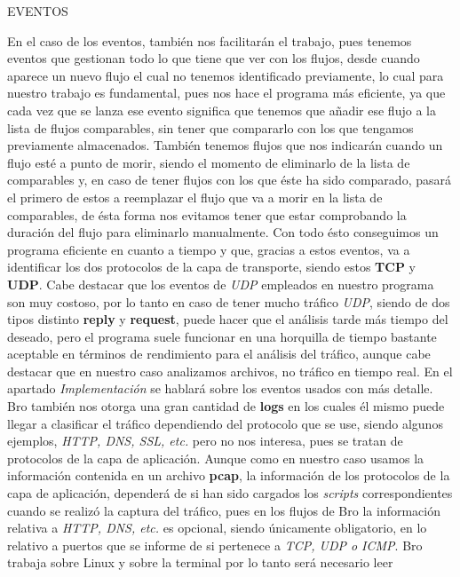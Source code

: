 EVENTOS

En el caso de los eventos, también nos facilitarán el trabajo, pues tenemos 
eventos que gestionan todo lo que tiene que ver con los flujos, desde 
cuando aparece un nuevo flujo el cual no tenemos identificado previamente, 
lo cual para nuestro trabajo es fundamental, pues nos hace el programa más 
eficiente, ya que cada vez que se lanza ese evento significa que tenemos 
que añadir ese flujo a la lista de flujos comparables, sin tener que 
compararlo con los que tengamos previamente almacenados. También tenemos 
flujos que nos indicarán cuando un flujo esté a punto de morir, siendo el 
momento de eliminarlo de la lista de comparables y, en caso de tener 
flujos con los que éste ha sido comparado, pasará el primero de estos a 
reemplazar el flujo que va a morir en la lista de comparables, de ésta 
forma nos evitamos tener que estar comprobando la duración del flujo 
para eliminarlo manualmente. Con todo ésto conseguimos un programa eficiente 
en cuanto a tiempo y que, gracias a estos eventos, va a identificar los dos 
protocolos de la capa de transporte, siendo estos \textbf{TCP} y \textbf{UDP}. Cabe destacar que los 
eventos de \textit{UDP} empleados en nuestro programa son muy costoso, por lo tanto 
en caso de tener mucho tráfico \textit{UDP}, siendo de dos tipos distinto \textbf{reply} y 
\textbf{request}, puede hacer que el análisis tarde más tiempo del deseado, pero 
el programa suele funcionar en una horquilla de tiempo bastante aceptable 
en términos de rendimiento para el análisis del tráfico, aunque cabe 
destacar que en nuestro caso analizamos archivos, no tráfico en tiempo real. 
En el apartado \textit{Implementación} se hablará sobre los eventos usados con más detalle.
\intro
Bro también nos otorga una gran cantidad de \textbf{logs} en los cuales él mismo puede 
llegar a clasificar el tráfico dependiendo del protocolo que se use, siendo 
algunos ejemplos, \textit{HTTP, DNS, SSL, etc.} pero no nos interesa, pues se tratan de protocolos 
de la capa de aplicación. Aunque como en nuestro caso usamos la información contenida en 
un archivo \textbf{pcap}, la información de los protocolos de la capa de aplicación, 
dependerá de si han sido cargados los \textit{scripts} correspondientes cuando se 
realizó la captura del tráfico, pues en los flujos 
de Bro la información relativa a \textit{HTTP, DNS, etc.} es opcional, siendo únicamente 
obligatorio, en lo relativo a puertos que se informe de si pertenece a \textit{TCP, UDP o ICMP}.
\intro
Bro trabaja sobre Linux y sobre la terminal por lo tanto será necesario leer 
